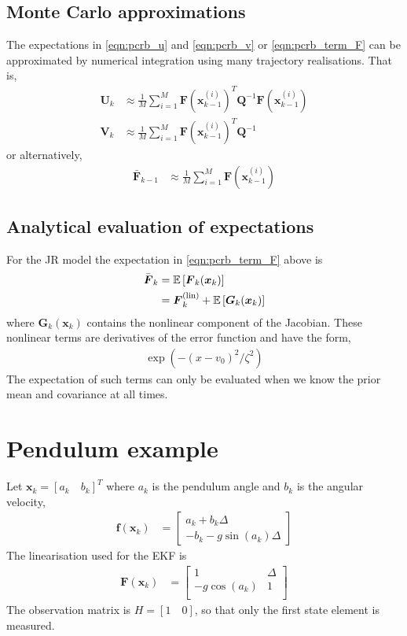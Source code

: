 \documentclass{article}
\renewcommand{\vec}[1]{\ensuremath{{\boldsymbol #1}}}
\newcommand{\mat}[1]{\ensuremath{\boldsymbol{#1}}}
\begin{document}
\subsection{Monte Carlo approximations}

The expectations in \eqref{eqn:pcrb_u} and \eqref{eqn:pcrb_v} or \eqref{eqn:pcrb_term_F} can be approximated by numerical integration using many trajectory realisations. That is,
\begin{align}
	\mat U_k &\approx \frac{1}{M}\sum_{i=1}^M \mat F(\vec x_{k-1}^{(i)})^T\mat Q^{-1} \mat F(\vec x_{k-1}^{(i)}) \\
	\mat V_k &\approx \frac{1}{M}\sum_{i=1}^M \mat F(\vec x_{k-1}^{(i)})^T\mat Q^{-1}  
\end{align}
or alternatively,
\begin{align}
	\bar{\mat F}_{k-1} &\approx \frac{1}{M}\sum_{i=1}^M \mat F(\vec x_{k-1}^{(i)})
\end{align}

\subsection{Analytical evaluation of expectations}

For the JR model the expectation in \eqref{eqn:pcrb_term_F} above is
\begin{align}
	\bar{\mat F}_k &= \mathbb E\left[ \mat F_k(\vec x_k)\right] \\
	&= \mat F_k^{\rm (lin)} + \mathbb E\left[ \mat G_k(\vec x_k)\right] 
\end{align}
where $\mat G_k(\vec x_k)$ contains the nonlinear component of the Jacobian. These nonlinear terms are derivatives of the error function and have the form,
\begin{align}
	\exp(-(x-v_0)^2/\zeta^2)
\end{align}
The expectation of such terms can only be evaluated when we know the prior mean and covariance at all times.


\section{Pendulum example}

Let $\vec x_k = [a_k\quad b_k]^T$ where $a_k$ is the pendulum angle and $b_k$ is the angular velocity,
\begin{align}
	\vec f(\vec x_{k}) &= \left[\begin{array}{c}
								a_k + b_k\Delta \\ -b_k - g\sin(a_k)\Delta
								\end{array}\right]
\end{align}
The linearisation used for the EKF is
\begin{align}
	\mat F(\vec x_{k}) &= \left[\begin{array}{cc}
					1 & \Delta \\
					-g\cos(a_k) & 1 \\
				\end{array}\right]
\end{align}
The observation matrix is $H=[1\quad 0]$, so that only the first state element is measured.
\end{document}

